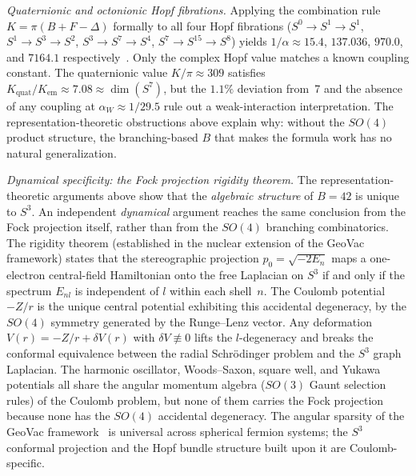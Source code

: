 \documentclass[aps,prl,twocolumn,superscriptaddress]{revtex4-2}
\begin{document}
\textit{Quaternionic and octonionic Hopf fibrations.}
Applying the combination rule $K = \pi(B + F - \Delta)$ formally to
all four Hopf fibrations
($S^0 \to S^1 \to S^1$, $S^1 \to S^3 \to S^2$,
$S^3 \to S^7 \to S^4$, $S^7 \to S^{15} \to S^8$) yields
$1/\alpha \approx 15.4$, $137.036$, $970.0$, and $7164.1$
respectively~\cite{phase6_hopf}. Only the complex Hopf value matches
a known coupling constant. The quaternionic value $K/\pi \approx 309$
satisfies $K_{\mathrm{quat}}/K_{\mathrm{em}} \approx 7.08 \approx
\dim(S^7)$, but the $1.1\%$ deviation from~7 and the absence of any
coupling at $\alpha_W \approx 1/29.5$ rule out a weak-interaction
interpretation. The representation-theoretic obstructions above
explain why: without the $SO(4)$ product structure, the
branching-based $B$ that makes the formula work has no natural
generalization.

\textit{Dynamical specificity: the Fock projection rigidity theorem.}
The representation-theoretic arguments above show that the
\textit{algebraic structure} of $B = 42$ is unique to $S^3$. An
independent \textit{dynamical} argument reaches the same conclusion
from the Fock projection itself, rather than from the $SO(4)$
branching combinatorics. The rigidity theorem (established in the
nuclear extension of the GeoVac framework) states that the
stereographic projection $p_0 = \sqrt{-2 E_n}$ maps a one-electron
central-field Hamiltonian onto the free Laplacian on $S^3$ if and
only if the spectrum $E_{nl}$ is independent of $l$ within each
shell~$n$. The Coulomb potential $-Z/r$ is the unique central
potential exhibiting this accidental degeneracy, by the $SO(4)$
symmetry generated by the Runge--Lenz vector. Any deformation
$V(r) = -Z/r + \delta V(r)$ with $\delta V \not\equiv 0$ lifts the
$l$-degeneracy and breaks the conformal equivalence between the
radial Schr\"odinger problem and the $S^3$ graph Laplacian.
The harmonic oscillator, Woods--Saxon, square well, and Yukawa
potentials all share the angular momentum algebra ($SO(3)$ Gaunt
selection rules) of the Coulomb problem, but none of them carries
the Fock projection because none has the $SO(4)$ accidental
degeneracy. The angular sparsity of the GeoVac
framework~\cite{paper22_sparsity} is universal across spherical
fermion systems; the $S^3$ conformal projection and the Hopf bundle
structure built upon it are Coulomb-specific.
\end{document}
